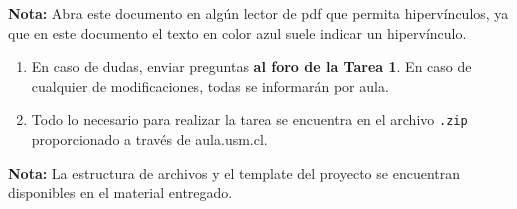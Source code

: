 \documentclass[11pt,spanish]{article}
\begin{document}
\begin{mdframed}[linecolor=blue!60!black, backgroundcolor=blue!5,
                 linewidth=1pt, roundcorner=5pt, innertopmargin=8pt,
                 innerbottommargin=8pt]
\textbf{Nota: }Abra este documento en algún lector de pdf que permita hipervínculos, ya que en este documento el texto en color azul suele indicar un hipervínculo.
\end{mdframed}


\begin{enumerate}[(1)]
  \item En caso de dudas, enviar preguntas \textbf{al foro de la Tarea 1}. En caso de cualquier de modificaciones, todas se informarán por aula.
  \item Todo lo necesario para realizar la tarea se encuentra en el archivo \verb|.zip| proporcionado a través de aula.usm.cl.
\end{enumerate}

\begin{mdframed}[linecolor=blue!60!black, backgroundcolor=blue!5,
                 linewidth=1pt, roundcorner=5pt, innertopmargin=8pt,
                 innerbottommargin=8pt]
                 \textbf{Nota:} La estructura de archivos y el template del proyecto se encuentran disponibles en el material entregado.
\end{mdframed}


\newpage
\end{document}
